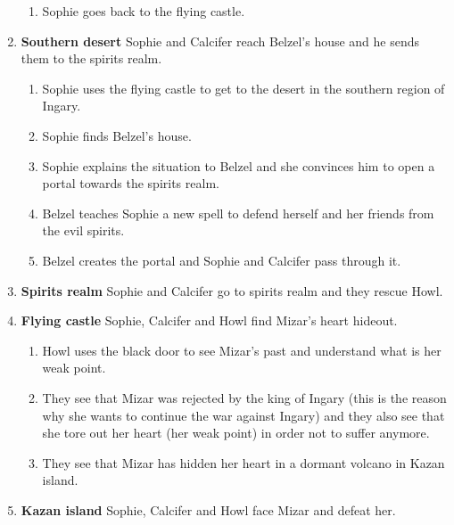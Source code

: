 \begin{enumerate}
\begin{enumerate}
    \item Sophie goes back to the flying castle.
  \end{enumerate}

\item \textbf{Southern desert} Sophie and Calcifer reach Belzel's house and he sends them to the spirits realm.

  \begin{enumerate}
  \item Sophie uses the flying castle to get to the desert in the southern region of Ingary.
    
  \item Sophie finds Belzel's house.
    
  \item Sophie explains the situation to Belzel and she convinces him to open a portal towards the spirits realm.
    
  \item Belzel teaches Sophie a new spell to defend herself and her friends from the evil spirits.
    
  \item Belzel creates the portal and Sophie and Calcifer pass through it.
  \end{enumerate}

\item \textbf{Spirits realm} Sophie and Calcifer go to spirits realm and they rescue Howl.

\item \textbf{Flying castle} Sophie, Calcifer and Howl find Mizar's heart hideout.

  \begin{enumerate}
  \item Howl uses the black door to see Mizar's past and understand what is her weak point.
    
  \item They see that Mizar was rejected by the king of Ingary (this is the reason why she wants to continue the war against Ingary) and they also see that she tore out her heart (her weak point) in order not to suffer anymore.
    
  \item They see that Mizar has hidden her heart in a dormant volcano in Kazan island.
  \end{enumerate}
    
\item \textbf{Kazan island} Sophie, Calcifer and Howl face Mizar and defeat her.


\end{enumerate}
